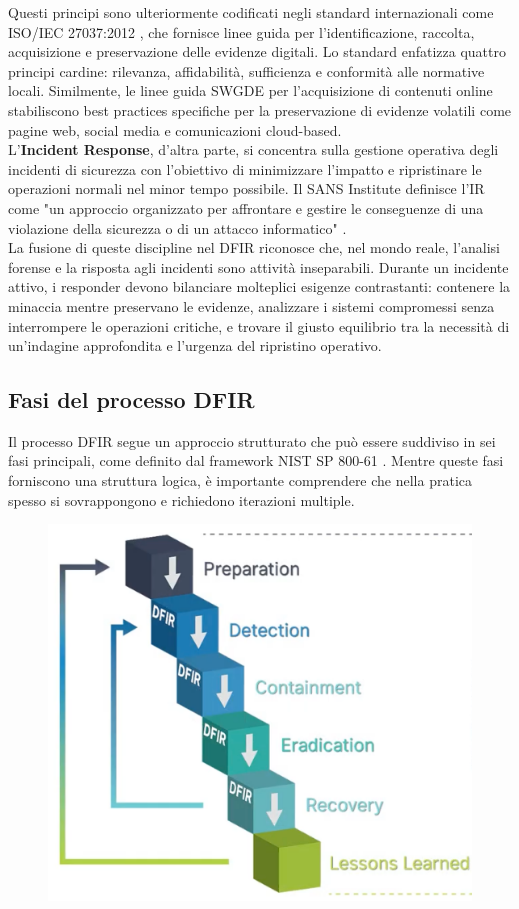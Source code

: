 Questi principi sono ulteriormente codificati negli standard internazionali come ISO/IEC 27037:2012 \cite{iso27037}, che fornisce linee guida per l'identificazione, raccolta, acquisizione e preservazione delle evidenze digitali. Lo standard enfatizza quattro principi cardine: rilevanza, affidabilità, sufficienza e conformità alle normative locali. Similmente, le linee guida SWGDE \cite{swgde2022} per l'acquisizione di contenuti online stabiliscono best practices specifiche per la preservazione di evidenze volatili come pagine web, social media e comunicazioni cloud-based.\\

L'\textbf{Incident Response}, d'altra parte, si concentra sulla gestione operativa degli incidenti di sicurezza con l'obiettivo di minimizzare l'impatto e ripristinare le operazioni normali nel minor tempo possibile. Il SANS Institute definisce l'IR come "un approccio organizzato per affrontare e gestire le conseguenze di una violazione della sicurezza o di un attacco informatico" \cite{sans2023}.\\

La fusione di queste discipline nel DFIR riconosce che, nel mondo reale, l'analisi forense e la risposta agli incidenti sono attività inseparabili. Durante un incidente attivo, i responder devono bilanciare molteplici esigenze contrastanti: contenere la minaccia mentre preservano le evidenze, analizzare i sistemi compromessi senza interrompere le operazioni critiche, e trovare il giusto equilibrio tra la necessità di un'indagine approfondita e l'urgenza del ripristino operativo.

\subsection{Fasi del processo DFIR}

Il processo DFIR segue un approccio strutturato che può essere suddiviso in sei fasi principali, come definito dal framework NIST SP 800-61 \cite{cichonski2012}. Mentre queste fasi forniscono una struttura logica, è importante comprendere che nella pratica spesso si sovrappongono e richiedono iterazioni multiple.

\begin{figure}[ht]
    \centering
    \includegraphics[width=0.6\linewidth]{images/stato-arte/digital-forensics-incident-response-plan-flow.png}
\end{figure}

